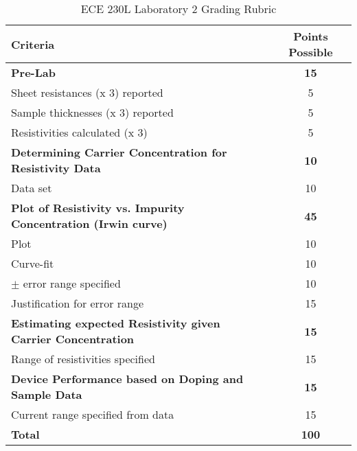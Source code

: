 \documentclass[12pt]{../manual}
\begin{document}
\newpage
{}
{}
\hspace{0pt}
\vfill
\begin{table}[ht!]
\caption{ECE 230L Laboratory 2 Grading Rubric}
\centering
\begin{tabular}{l|c} \hline
Criteria & Points Possible \\ \hline \hline
\textbf{Pre-Lab}	& \textbf{15}\\ 
Sheet resistances (x 3) reported & 5 \\ 
Sample thicknesses (x 3) reported & 5 \\ 
Resistivities calculated (x 3) & 5 \\ \hline
\textbf{Determining Carrier Concentration for Resistivity Data} & \textbf{10} \\ 
Data set & 10 \\ \hline
\textbf{Plot of Resistivity vs. Impurity Concentration (Irwin curve)} & \textbf{45} \\ 
            Plot & 10 \\ 
            Curve-fit & 10 \\ 
            $\pm$ error range specified & 10\\ 
              Justification for error range	& 15 \\ \hline
\textbf{Estimating expected Resistivity given Carrier Concentration} & \textbf{15} \\ 
Range of resistivities specified & 15 \\ \hline
\textbf{Device Performance based on Doping and Sample Data} & \textbf{15} \\ 
              Current range specified from data & 15 \\ \hline \hline
\textbf{Total}	& \textbf{100} \\ \hline
\end{tabular}
\end{table}
\vfill
%
\end{document}
